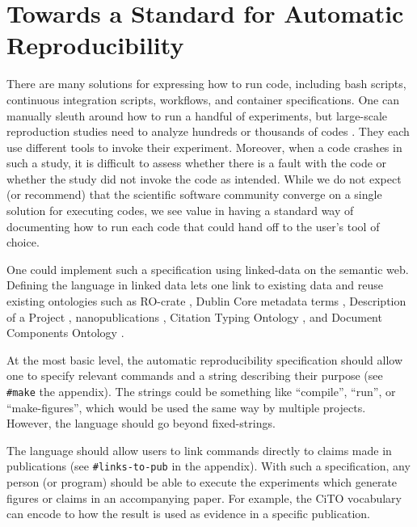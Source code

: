 \documentclass[manuscript]{acmart}
\begin{document}
\hypertarget{towards-a-standard-for-automatic-reproducibility}{%
\section{Towards a Standard for Automatic
Reproducibility}\label{towards-a-standard-for-automatic-reproducibility}}

There are many solutions for expressing how to run code, including bash
scripts, continuous integration scripts, workflows, and container
specifications. One can manually sleuth around how to run a handful of
experiments, but large-scale reproduction studies need to analyze
hundreds or thousands of codes
\cite{collberg_repeatability_2016,zhao_why_2012,grayson_automatic_2023}.
They each use different tools to invoke their experiment. Moreover, when
a code crashes in such a study, it is difficult to assess whether there
is a fault with the code or whether the study did not invoke the code as
intended. While we do not expect (or recommend) that the scientific
software community converge on a single solution for executing codes, we
see value in having a standard way of documenting how to run each code
that could hand off to the user's tool of choice.

One could implement such a specification using linked-data on the
semantic web. Defining the language in linked data lets one link to
existing data and reuse existing ontologies such as RO-crate
\cite{soiland-reyes_packaging_2022}, Dublin Core metadata terms
\cite{weibel_dublin_2000}, Description of a Project
\cite{wilder-james_description_2017}, nanopublications
\cite{groth_anatomy_2010}, Citation Typing Ontology
\cite{shotton_cito_2010}, and Document Components Ontology
\cite{constantin_document_2016}.

At the most basic level, the automatic reproducibility specification
should allow one to specify relevant commands and a string describing
their purpose (see \texttt{\#make} the appendix). The strings could be
something like ``compile'', ``run'', or ``make-figures'', which would be
used the same way by multiple projects. However, the language should go
beyond fixed-strings.

The language should allow users to link commands directly to claims made
in publications (see \texttt{\#links-to-pub} in the appendix). With such
a specification, any person (or program) should be able to execute the
experiments which generate figures or claims in an accompanying paper.
For example, the CiTO vocabulary \cite{shotton_cito_2010} can encode to
how the result is used as evidence in a specific publication.
\end{document}
